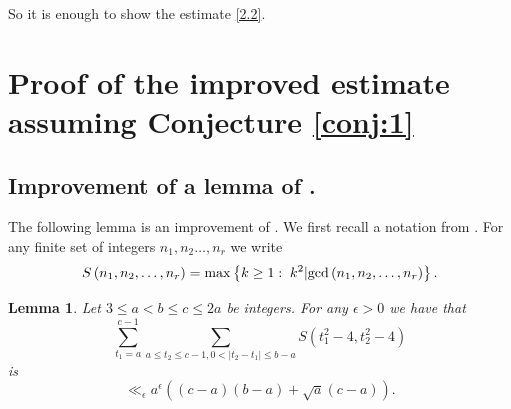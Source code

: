 \documentclass[12pt]{amsart}
\newtheorem{lemma}[theorem]{Lemma}
\theoremstyle{definition}
\numberwithin{equation}{section}
\begin{document}
So it is enough to show the estimate \eqref{2.2}.




\section{Proof of the improved estimate assuming Conjecture \ref{conj:1}}

\subsection{Improvement of a lemma of \cite{Biro}.}

The following lemma is an improvement of \cite[(3.20)]{Biro}. We first recall a notation from \cite{Biro}. For any finite set of integers $n_1, n_2\ldots ,n_r$ we write
\[S\left(n_1,n_2,\ldots ,n_r\right)=\max\left\{k\ge 1:\;k^2|{\rm g}
{\rm c}{\rm d}\left(n_1,n_2,\ldots ,n_r\right)\right\}.\]
\begin{lemma}\label{lem:1}Let $3\le a<b\le c\le 2a$ be integers.
For any $\epsilon >0$ we have that
\begin{equation}\sum_{t_1=a}^{c-1}\sum_{a\le t_2\le c-1,0<\left|t_
2-t_1\right|\le b-a}S\left(t_1^2-4,t_2^2-4\right)\label{1}\end{equation}
is
\[\ll_{\epsilon}a^{\epsilon}\left(\left(c-a\right)\left(b-a\right
)+\sqrt a\left(c-a\right)\right).\]
\end{lemma}
\end{document}
